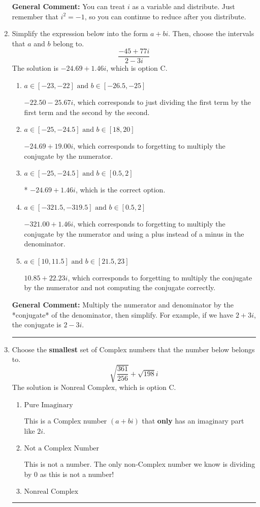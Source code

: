 \documentclass{extbook}[14pt]
\newcommand{\litem}[1]{\item #1

\rule{\textwidth}{0.4pt}}
\begin{document}
\begin{enumerate}
{\textbf{General Comment:} You can treat $i$ as a variable and distribute. Just remember that $i^2=-1$, so you can continue to reduce after you distribute.
}
\litem{
Simplify the expression below into the form $a+bi$. Then, choose the intervals that $a$ and $b$ belong to.
\[ \frac{-45 + 77 i}{2 - 3 i} \]The solution is \( -24.69  + 1.46 i \), which is option C.\begin{enumerate}[label=\Alph*.]
\item \( a \in [-23, -22] \text{ and } b \in [-26.5, -25] \)

 $-22.50  - 25.67 i$, which corresponds to just dividing the first term by the first term and the second by the second.
\item \( a \in [-25, -24.5] \text{ and } b \in [18, 20] \)

 $-24.69  + 19.00 i$, which corresponds to forgetting to multiply the conjugate by the numerator.
\item \( a \in [-25, -24.5] \text{ and } b \in [0.5, 2] \)

* $-24.69  + 1.46 i$, which is the correct option.
\item \( a \in [-321.5, -319.5] \text{ and } b \in [0.5, 2] \)

 $-321.00  + 1.46 i$, which corresponds to forgetting to multiply the conjugate by the numerator and using a plus instead of a minus in the denominator.
\item \( a \in [10, 11.5] \text{ and } b \in [21.5, 23] \)

 $10.85  + 22.23 i$, which corresponds to forgetting to multiply the conjugate by the numerator and not computing the conjugate correctly.
\end{enumerate}

\textbf{General Comment:} Multiply the numerator and denominator by the *conjugate* of the denominator, then simplify. For example, if we have $2+3i$, the conjugate is $2-3i$.
}
\litem{
Choose the \textbf{smallest} set of Complex numbers that the number below belongs to.
\[ \sqrt{\frac{361}{256}}+\sqrt{198} i \]The solution is \( \text{Nonreal Complex} \), which is option C.\begin{enumerate}[label=\Alph*.]
\item \( \text{Pure Imaginary} \)

This is a Complex number $(a+bi)$ that \textbf{only} has an imaginary part like $2i$.
\item \( \text{Not a Complex Number} \)

This is not a number. The only non-Complex number we know is dividing by 0 as this is not a number!
\item \( \text{Nonreal Complex} \)


\end{enumerate}}
\end{enumerate}
\end{document}

